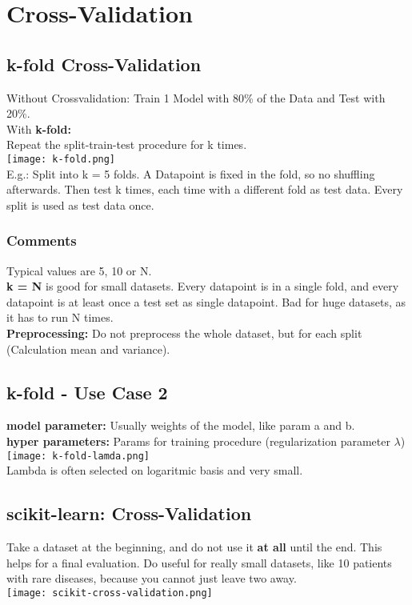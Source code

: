 \section{Cross-Validation}
\subsection{k-fold Cross-Validation}
Without Crossvalidation: Train 1 Model with 80\% of the Data and Test with 20\%.\\
With \textbf{k-fold:}\\
Repeat the split-train-test procedure for k times.\\
\texttt{[image: k-fold.png]}\\
E.g.: Split into k = 5 folds.
A Datapoint is fixed in the fold, so no shuffling afterwards.
Then test k times, each time with a different fold as test data. 
Every split is used as test data once.
\subsubsection{Comments}
Typical values are 5, 10 or N.\\
\textbf{k = N} is good for small datasets. 
Every datapoint is in a single fold, and every datapoint is at least once a test set as single datapoint.
Bad for huge datasets, as it has to run N times.\\
\textbf{Preprocessing:} Do not preprocess the whole dataset, but for each split (Calculation mean and variance).

\subsection{k-fold - Use Case 2}
\textbf{model parameter:} Usually weights of the model, like param a and b.\\
\textbf{hyper parameters:} Params for training procedure (regularization parameter $\lambda$)\\
\texttt{[image: k-fold-lamda.png]}\\
Lambda is often selected on logaritmic basis and very small.

\subsection{scikit-learn: Cross-Validation}
Take a dataset at the beginning, and do not use it \textbf{at all} until the end.
This helps for a final evaluation. 
Do useful for really small datasets, like 10 patients with rare diseases, because you cannot just leave two away.\\
\texttt{[image: scikit-cross-validation.png]}

